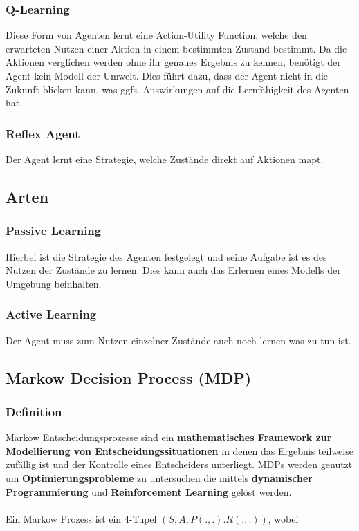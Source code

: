 \documentclass[10pt]{scrartcl}
\begin{document}
\subsubsection{Q-Learning}
Diese Form von Agenten lernt eine \glqq Action-Utility Function\grqq\xspace, welche den erwarteten Nutzen einer Aktion in einem bestimmten Zustand bestimmt. Da die Aktionen verglichen werden ohne ihr genaues Ergebnis zu kennen, benötigt der Agent kein Modell der Umwelt. Dies führt dazu, dass der Agent nicht in die Zukunft blicken kann, was ggfs. Auswirkungen auf die Lernfähigkeit des Agenten hat.

\subsubsection{Reflex Agent}
Der Agent lernt eine Strategie, welche Zustände direkt auf Aktionen mapt.

\subsection{Arten}
\subsubsection{Passive Learning}
Hierbei ist die Strategie des Agenten festgelegt und seine Aufgabe ist es des Nutzen der Zustände zu lernen. Dies kann auch das Erlernen eines Modells der Umgebung beinhalten.

\subsubsection{Active Learning}
Der Agent muss zum Nutzen einzelner Zustände auch noch lernen was zu tun ist.

\subsection{Markow Decision Process (MDP)}
\subsubsection{Definition}
Markow Entscheidungsprozesse sind ein \textbf{mathematisches Framework zur Modellierung von Entscheidungssituationen} in denen das Ergebnis teilweise zufällig ist und der Kontrolle eines Entscheiders unterliegt. MDPs werden genutzt um \textbf{Optimierungsprobleme} zu untersuchen die mittels \textbf{dynamischer Programmierung} und \textbf{Reinforcement Learning} gelöst werden.\\
\\
Ein Markow Prozess ist ein 4-Tupel $(S,A,P(.,.).R(.,.))$, wobei
\end{document}
